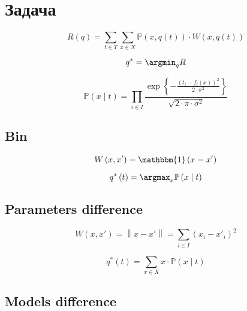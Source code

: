 \section{Задача}

\begin{equation*}
  R \left( q \right)
  = \sum\limits_{t \in T} \sum\limits_{x \in X}
    \mathbb{P} \left( x,  q\left( t \right) \right)
    \cdot W \left( x, q\left( t \right) \right)
\end{equation*}

\begin{equation*}
  q^* = \argmin_q R
\end{equation*}

\begin{equation*}
  \mathbb{P}\left( x \mid t \right)
  = \prod_{i \in I}
    \frac{\exp{\left\{- \frac{\left( t_i - f_i\left( x \right) \right)^2}
           {2 \cdot \sigma^2} \right\}}}
         {\sqrt{2 \cdot \pi \cdot \sigma^2}}
\end{equation*}

\subsection{Bin}

\begin{equation*}
  W \left( x, x' \right)
  = \mathbbm{1} \left( x = x' \right)
\end{equation*}

\begin{equation*}
  q^* \left( t \right)
  = \argmax_x \mathbb{P} \left( x \mid  t \right)
\end{equation*}

\subsection{Parameters difference}

\begin{equation*}
  W \left( x, x' \right)
  = \left\| x - x' \right\|
  = \sum_{i \in I} \left( x_i - x'_i \right)^2
\end{equation*}

\begin{equation*}
  q^* \left( t \right)
  = \sum_{x \in X} x \cdot \mathbb{P}\left( x \mid t \right)
\end{equation*}

\subsection{Models difference}

